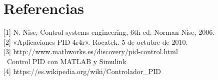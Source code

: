 \documentclass[12pt,letterpaper]{article}
\begin{document}
 
\section{Referencias}
[1] N. Nise, Control systems engineering, 6th ed. Norman Nise, 2006. \\ 

[2] «Aplicaciones PID 4r4r». Rocatek. 5 de octubre de 2010. \\

[3] http://www.mathworks.es/discovery/pid-control.html \\ \ Control PID con MATLAB y Simulink \\


[4] https://es.wikipedia.org/wiki/Controlador\_PID \\ 
\end{document}

